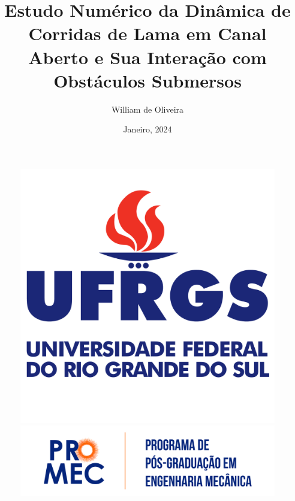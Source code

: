 \documentclass[aspectratio=169]{beamer}
\author{William de Oliveira}
\title[Introdução à Comunicação Científica e Projeto]{Estudo Numérico da Dinâmica de Corridas de Lama em Canal Aberto e Sua Interação com Obstáculos Submersos}
\subtitle{}
\institute{UFRGS | PROMEC | MEC-153}
\date{Janeiro, 2024}
\begin{document}
\begin{frame}
    \titlepage
    \vspace{-10pt}
    \begin{figure}
        \centering
        \begin{minipage}[c][0.2\textheight][c]{0.24\textwidth}
            \centering
            \includegraphics[height=0.24\textheight]{images/logos/ufrgs.png}
        \end{minipage}
        \hfill
        \begin{minipage}[c][0.2\textheight][c]{0.24\textwidth}
            \centering
            \includegraphics[height=0.18\textheight]{images/logos/promec.png}
        \end{minipage}
        \hfill
        \begin{minipage}[c][0.2\textheight][c]{0.24\textwidth}
            \centering

\end{minipage}
\end{figure}
\end{frame}
\end{document}
